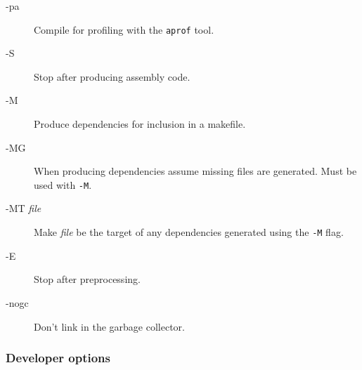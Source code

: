 \begin{description}
\item[-pa]
  Compile for profiling with the \texttt{aprof} tool.
\item[-S]
  Stop after producing assembly code.
\item[-M]
  Produce dependencies for inclusion in a makefile.
\item[-MG]
  When producing dependencies assume missing files are generated.
  Must be used with \texttt{-M}.
\item[-MT \textit{file}]
  Make \textit{file} be the target of any dependencies generated using
  the \texttt{-M} flag.
\item[-E]
  Stop after preprocessing.
\item[-nogc]
  Don't link in the garbage collector.
\end{description}

\subsubsection*{Developer options}


